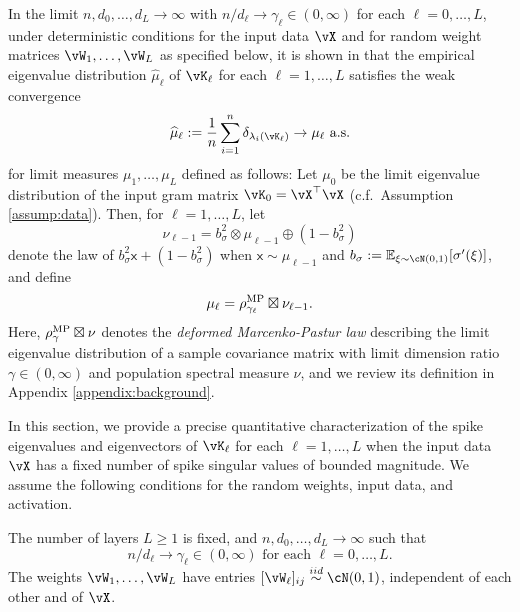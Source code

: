 In the limit $n,d_0,\ldots,d_L \to \infty$ with
$n/d_\ell \to \gamma_\ell \in (0,\infty)$
for each $\ell=0,\ldots,L$, under deterministic
conditions for the input data $\vX$ and for random weight matrices
$\vW_1,\ldots,\vW_L$ as specified below, it is shown in \cite{fan2020spectra}
that the empirical eigenvalue distribution
$\widehat{\mu}_\ell$ of $\vK_\ell$ for each $\ell=1,\ldots,L$ satisfies
the weak convergence
\begin{equation}\label{eq:CKweakconvergence}
\widehat{\mu}_\ell:=\frac{1}{n}\sum_{i=1}^n \delta_{\lambda_i(\vK_\ell)}
\to \mu_\ell \text{ a.s.}
\end{equation}
for limit measures $\mu_1,\ldots,\mu_L$ defined 
as follows: Let $\mu_0$ be the limit eigenvalue distribution of the input gram
matrix $\vK_0=\vX^\top \vX$ (c.f.\ Assumption \ref{assump:data}).
Then, for $\ell=1,\ldots,L$, let
\begin{equation}\label{eq:nu_L_def}
	\nu_{\ell-1}=b_\sigma^2 \otimes \mu_{\ell-1} \oplus (1-b_\sigma^2)
\end{equation}
denote the law of $b_\sigma^2 \mathsf{x}+(1-b_\sigma^2)$ when $\mathsf{x}
\sim \mu_{\ell-1}$ and $b_\sigma:=\E_{\xi \sim \cN(0,1)}[\sigma'(\xi)]$,
and define
\begin{align}\label{eq:mu_L_def}
\mu_\ell=\rho^{\textnormal{MP}}_{\gamma_\ell}\boxtimes \nu_{\ell-1}.
\end{align}
Here, $\rho_\gamma^{\textnormal{MP}} \boxtimes \nu$ denotes the \emph{deformed Marcenko-Pastur
law} describing the limit eigenvalue distribution of a sample covariance
matrix with limit dimension ratio $\gamma \in (0,\infty)$ and population
spectral measure $\nu$, and we review its definition in Appendix
\ref{appendix:background}.

In this section, we provide a precise quantitative characterization of the spike
eigenvalues and eigenvectors of $\vK_\ell$ for each $\ell=1,\ldots,L$ when the
input data $\vX$ has a fixed number of spike singular values of bounded
magnitude. We assume the following conditions for the random weights, input
data, and activation.

\begin{assumption}\label{assump:NNasymptotics}
The number of layers $L \geq 1$ is fixed, and
$n,d_0,\ldots,d_L \to \infty$ such that
\[n/d_\ell \to \gamma_\ell \in (0,\infty) \text{ for each } \ell=0,\ldots,L.\]
The weights $\vW_1,\ldots,\vW_L$ have entries
$[\vW_\ell]_{ij} \overset{iid}{\sim} \cN(0,1)$, independent of each other and
of $\vX$.
\end{assumption}

